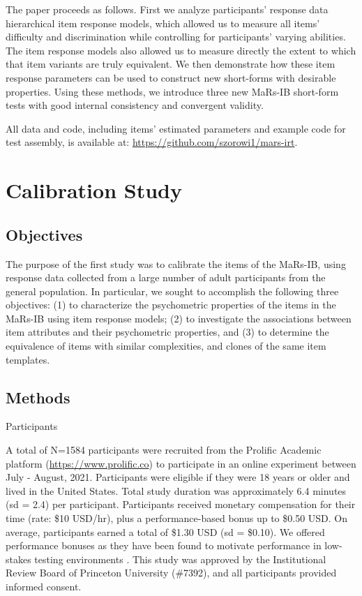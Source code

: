 \documentclass[a4paper,man,natbib]{apa6}
\makeatletter
\renewcommand{\subsubsection}{\@startsection{subsubsection}{3}
  {\z@}%
  {\b@level@two@skip}{\e@level@two@skip}%
  {\normalfont\normalsize\bfseries}}
\makeatother
\begin{document}
The paper proceeds as follows. First we analyze participants' response data hierarchical item response models, which allowed us to measure all items' difficulty and discrimination while controlling for participants' varying abilities. The item response models also allowed us to measure directly the extent to which that item variants are truly equivalent. We then demonstrate how these item response parameters can be used to construct new short-forms with desirable properties. Using these methods, we introduce three new MaRs-IB short-form tests with good internal consistency and convergent validity. 

All data and code, including items' estimated parameters and example code for test assembly, is available at: \url{https://github.com/szorowi1/mars-irt}.

\section{Calibration Study}

\subsection{Objectives}

The purpose of the first study was to calibrate the items of the MaRs-IB, using response data collected from a large number of adult participants from the general population. In particular, we sought to accomplish the following three objectives: (1) to characterize the psychometric properties of the items in the MaRs-IB using item response models; (2) to investigate the associations between item attributes and their psychometric properties, and (3) to determine the equivalence of items with similar complexities, and clones of the same item templates. 

\subsection{Methods}

\subsubsection{Participants} 

A total of N=1584 participants were recruited from the Prolific Academic platform (\url{https://www.prolific.co}) to participate in an online experiment between July - August, 2021. Participants were eligible if they were 18 years or older and lived in the United States. Total study duration was approximately 6.4 minutes (sd = 2.4) per participant. Participants received monetary compensation for their time (rate: \$10 USD/hr), plus a performance-based bonus up to \$0.50 USD. On average, participants earned a total of \$1.30 USD (sd = \$0.10). We offered performance bonuses as they have been found to motivate performance in low-stakes testing environments \citep{duckworth2011role, gignac2018moderate}. This study was approved by the Institutional Review Board of Princeton University (\#7392), and all participants provided informed consent.
\end{document}
